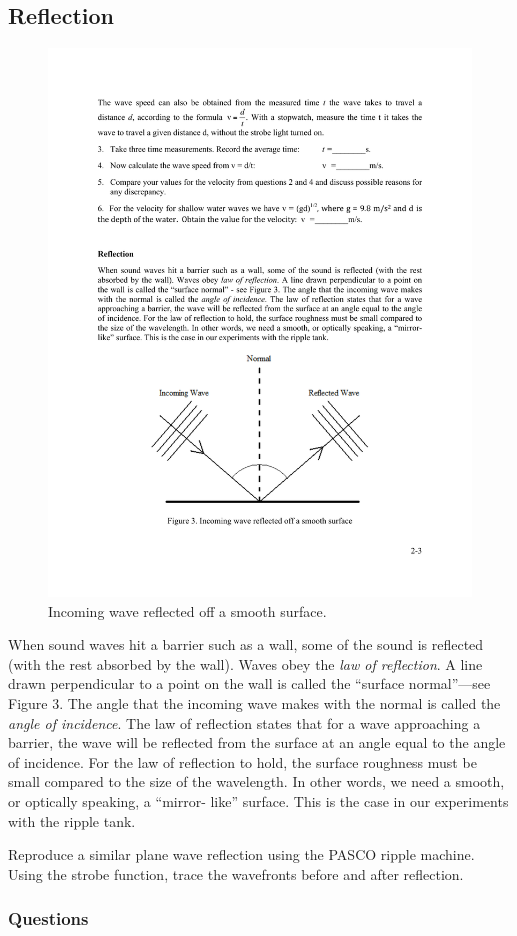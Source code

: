 \documentclass[11pt]{NSF}
\begin{document}
\subsection{Reflection}
%
\begin{figure}[hbtp]
\begin{center}
\includegraphics[width=.6\textwidth]{fig2_3}
\caption{Incoming wave reflected off a smooth surface.}
\label{f:3}
\end{center}
\end{figure}
%
When sound waves hit a barrier such as a wall, some of the sound is reflected
(with the rest absorbed by the wall). 
Waves obey the {\em law of reflection}. 
A line
drawn perpendicular to a point on the wall is called the ``surface normal”---see
Figure 3. The angle that the incoming wave makes with the normal is called the
{\em angle of incidence}. The law of reflection states that for a wave approaching a
barrier, the wave will be reflected from the surface at an angle equal to the
angle of incidence. For the law of reflection to hold, the surface roughness
must be small compared to the size of the wavelength. In other words, we need a
smooth, or optically speaking, a ``mirror- like” surface. This is the case in
our experiments with the ripple tank.

Reproduce a similar plane wave reflection using the PASCO ripple machine. Using the strobe function, trace the wavefronts before and after reflection.  

\subsubsection*{Questions}
\end{document}
